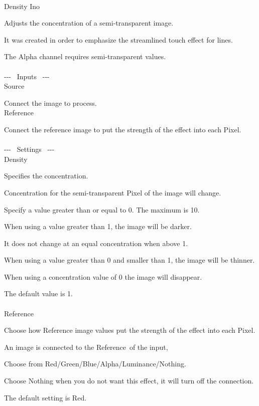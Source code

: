 \documentclass[a4paper,12pt]{article}
\begin{document}
\thispagestyle{empty}

\Large
\noindent \\
Density Ino\medskip
\par
\normalsize
Adjusts the concentration of a semi-transparent image.\par
It was created in order to emphasize the streamlined touch effect for lines.\par
The Alpha channel requires semi-transparent values.\\
\\
-{-}- \ Inputs \ -{-}-\\
Source\par
Connect the image to process.\\
Reference\par
Connect the reference image to put the strength of the effect into each Pixel.\\
\\
-{-}- \ Settings \ -{-}-\\
Density\par
Specifies the concentration.\par
Concentration for the semi-transparent Pixel of the image will change.\par
Specify a value greater than or equal to 0. The maximum is 10.\par
When using a value greater than 1, the image will be darker.\par
It does not change at an equal concentration when above 1.\par
When using a value greater than 0 and smaller than 1, the image will be thinner.\par
When using a concentration value of 0 the image will disappear.\par
The default value is 1.\\
\\
Reference\par
Choose how Reference image values put the strength of the effect into each Pixel.\par
An image is connected to the \textquotedbl Reference\textquotedbl \ of the input,\par
Choose from Red/Green/Blue/Alpha/Luminance/Nothing.\par
Choose Nothing when you do not want this effect, it will turn off the connection.\par
The default setting is Red.
\end{document}
